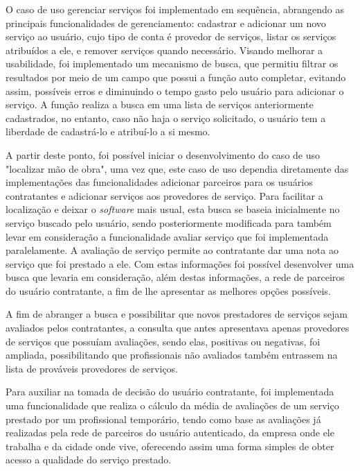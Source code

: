 \par O caso de uso gerenciar serviços foi implementado em sequência, abrangendo as principais funcionalidades de gerenciamento: cadastrar e adicionar um novo serviço ao usuário, cujo tipo de conta é provedor de serviços, listar os serviços atribuídos a ele, e remover serviços quando necessário. Visando melhorar a usabilidade, foi implementado um mecanismo de busca, que permitiu filtrar os resultados por meio de um campo que possui a função  auto completar, evitando assim, possíveis erros e diminuindo o tempo gasto pelo usuário para adicionar o serviço. A função realiza a busca em uma lista de serviços anteriormente cadastrados, no entanto, caso não haja o serviço solicitado, o usuário tem a liberdade de cadastrá-lo e atribuí-lo a si mesmo.

\par A partir deste ponto, foi possível iniciar o desenvolvimento do caso de uso "localizar mão de obra", uma vez que, este caso de uso dependia diretamente das implementações das funcionalidades adicionar parceiros para os usuários contratantes e adicionar serviços aos provedores de serviço. Para facilitar a localização e deixar o \textit{software} mais usual, esta busca se baseia inicialmente no serviço buscado pelo usuário, sendo posteriormente modificada para também levar em consideração a funcionalidade avaliar serviço que foi implementada paralelamente. A avaliação de serviço permite ao contratante dar uma nota ao serviço que foi prestado a ele. Com estas informações foi possível desenvolver uma busca que levaria em consideração, além destas informações, a rede de parceiros do usuário contratante, a fim de lhe apresentar as melhores opções possíveis.

\par A fim de abranger a busca e possibilitar que novos prestadores de serviços sejam avaliados pelos contratantes, a consulta que antes apresentava apenas provedores de serviços que possuíam avaliações, sendo elas, positivas ou negativas, foi ampliada, possibilitando que profissionais não avaliados também entrassem na lista de prováveis provedores de serviços.

\par Para auxiliar na tomada de decisão do usuário contratante, foi implementada uma funcionalidade que realiza o cálculo da média de avaliações de um serviço prestado por um profissional temporário, tendo como base as avaliações já realizadas pela rede de parceiros do usuário autenticado, da empresa onde ele trabalha e da cidade onde vive, oferecendo assim uma forma simples de obter acesso a qualidade do serviço prestado.

